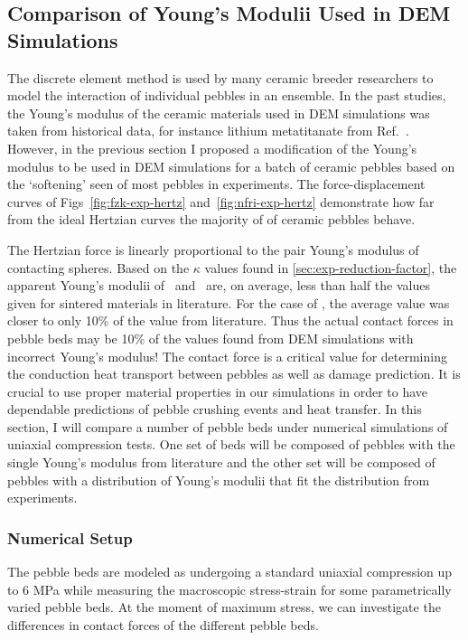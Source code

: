 \subsection{Comparison of Young's Modulii Used in DEM Simulations}\label{sec:dem-studies-youngs-modulus}

The discrete element method is used by many ceramic breeder researchers to model the interaction of individual pebbles in an ensemble.\cite{An20071393, Lu2000, Zhao2010, Gan:2010uq, Annabattula2012a, VanLew2014} In the past studies, the Young's modulus of the ceramic materials used in DEM simulations was taken from historical data, for instance lithium metatitanate from Ref.~\cite{Gierszewski1998}. However, in the previous section I proposed a modification of the Young's modulus to be used in DEM simulations for a batch of ceramic pebbles based on the `softening' seen of most pebbles in experiments. The force-displacement curves of Figs~\ref{fig:fzk-exp-hertz} and~\ref{fig:nfri-exp-hertz} demonstrate how far from the ideal Hertzian curves the majority of of ceramic pebbles behave.

The Hertzian force is linearly proportional to the pair Young's modulus of contacting spheres. Based on the $\kappa$ values found in \cref{sec:exp-reduction-factor}, the apparent Young's modulii of \lis~and \lit~are, on average, less than half the values given for sintered materials in literature. For the case of \lit, the average value was closer to only 10\% of the value from literature. Thus the actual contact forces in pebble beds may be 10\% of the values found from DEM simulations with incorrect Young's modulus! The contact force is a critical value for determining the conduction heat transport between pebbles as well as damage prediction. It is crucial to use proper material properties in our simulations in order to have dependable predictions of pebble crushing events and heat transfer. In this section, I will compare a number of pebble beds under numerical simulations of uniaxial compression tests. One set of beds will be composed of pebbles with the single Young's modulus from literature and the other set will be composed of pebbles with a distribution of Young's modulii that fit the distribution from experiments.



\subsubsection{Numerical Setup}
The pebble beds are modeled as undergoing a standard uniaxial compression up to 6 MPa while measuring the macroscopic stress-strain for some parametrically varied pebble beds. At the moment of maximum stress, we can investigate the differences in contact forces of the different pebble beds.

